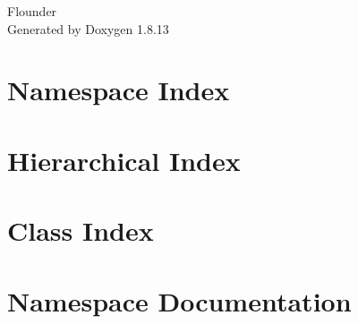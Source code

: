 \documentclass[twoside]{book}
\newcommand{\+}{\discretionary{\mbox{\scriptsize$\hookleftarrow$}}{}{}}
\newcommand{\clearemptydoublepage}{%
  \newpage{\pagestyle{empty}\cleardoublepage}%
}
\begin{document}
\hypersetup{pageanchor=false,
             bookmarksnumbered=true,
             pdfencoding=unicode
            }
\begin{titlepage}
\vspace*{7cm}
\begin{center}%
{\Large Flounder }\\
\vspace*{1cm}
{\large Generated by Doxygen 1.8.13}\\
\end{center}
\end{titlepage}
\clearemptydoublepage
{}
\tableofcontents
\clearemptydoublepage
{}
\hypersetup{pageanchor=true}

\chapter{Namespace Index}

\chapter{Hierarchical Index}

\chapter{Class Index}

\chapter{Namespace Documentation}

\end{document}
